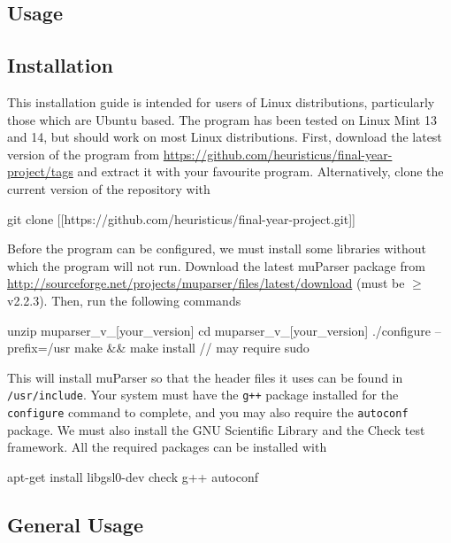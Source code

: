 \documentclass[a4paper,11pt]{article}
\begin{document}
\newpage
\printbibliography
\newpage
\begin{appendices}
\section{Usage}
\label{sec-10}
\subsection{Installation}
\label{sec-10-1}

   This installation guide is intended for users of Linux distributions,
   particularly those which are Ubuntu based. The program has been tested on
   Linux Mint 13 and 14, but should work on most Linux distributions. First,
   download the latest version of the program from
   \href{https://github.com/heuristicus/final-year-project/tags}{https://github.com/heuristicus/final-year-project/tags} and extract it with
   your favourite program. Alternatively, clone the current version of the
   repository with 
\begin{verbatimtab} 
git clone [[https://github.com/heuristicus/final-year-project.git]]
\end{verbatimtab}
   Before the program can be configured, we must install some libraries without
   which the program will not run. Download the latest muParser package from
   \href{http://sourceforge.net/projects/muparser/files/latest/download}{http://sourceforge.net/projects/muparser/files/latest/download} (must be
   $\geq$ v2.2.3). Then, run the following commands
\begin{verbatimtab}
unzip muparser_v_[your_version]
cd muparser_v_[your_version]
./configure --prefix=/usr
make && make install // may require sudo
\end{verbatimtab}
   This will install muParser so that the header files it uses can be found in
   \texttt{/usr/include}. Your system must have the \texttt{g++} package
   installed for the \texttt{configure} command to complete, and you may also
   require the \texttt{autoconf} package. We must also install the GNU
   Scientific Library and the Check test framework. All the required packages
   can be installed with
\begin{verbatimtab}
apt-get install libgsl0-dev check g++ autoconf
\end{verbatimtab}
\subsection{General Usage}
\label{sec-10-2}


\end{appendices}
\end{document}
